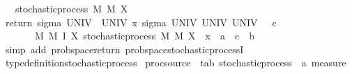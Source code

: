 \begin{isabellebody}
{\ \ \ stochastic{\isacharunderscore}{\kern0pt}process\ M\ M{\isacharprime}{\kern0pt}\ X{\isacharbraceright}{\kern0pt}{\isachardoublequoteclose}%
}%
%
\isadelimproof
%
\endisadelimproof
%
\isatagproof
{}\isamarkupfalse%
\isanewline
\ \ \isamarkupfalse%
\ {\isachardoublequoteopen}{\isacharparenleft}{\kern0pt}return\ {\isacharparenleft}{\kern0pt}sigma\ UNIV\ {\isacharbraceleft}{\kern0pt}{\isacharbraceleft}{\kern0pt}{\isacharbraceright}{\kern0pt}{\isacharcomma}{\kern0pt}\ UNIV{\isacharbraceright}{\kern0pt}{\isacharparenright}{\kern0pt}\ x{\isacharcomma}{\kern0pt}\ sigma\ UNIV\ UNIV{\isacharcomma}{\kern0pt}\ UNIV{\isacharcomma}{\kern0pt}\ {\isasymlambda}{\isacharunderscore}{\kern0pt}\ {\isacharunderscore}{\kern0pt}{\isachardot}{\kern0pt}\ c{\isacharparenright}{\kern0pt}\ {\isasymin}\isanewline
\ \ \ \ \ \ \ {\isacharbraceleft}{\kern0pt}{\isacharparenleft}{\kern0pt}M{\isacharcomma}{\kern0pt}\ M{\isacharprime}{\kern0pt}{\isacharcomma}{\kern0pt}\ I{\isacharcomma}{\kern0pt}\ X{\isacharparenright}{\kern0pt}{\isachardot}{\kern0pt}\ stochastic{\isacharunderscore}{\kern0pt}process\ M\ M{\isacharprime}{\kern0pt}\ X{\isacharbraceright}{\kern0pt}{\isachardoublequoteclose}\ \ x\ {\isacharcolon}{\kern0pt}{\isacharcolon}{\kern0pt}\ {\isacharprime}{\kern0pt}a\ \ c\ {\isacharcolon}{\kern0pt}{\isacharcolon}{\kern0pt}\ {\isacharprime}{\kern0pt}b\isanewline
\ \ \ \ \isamarkupfalse%
\ {\isacharparenleft}{\kern0pt}simp\ add{\isacharcolon}{\kern0pt}\ prob{\isacharunderscore}{\kern0pt}space{\isacharunderscore}{\kern0pt}return\ prob{\isacharunderscore}{\kern0pt}space{\isachardot}{\kern0pt}stochastic{\isacharunderscore}{\kern0pt}processI{\isacharparenright}{\kern0pt}\isanewline
{}\isamarkupfalse%
%
\endisatagproof
{\isafoldproof}%
%
\isadelimproof
%
\endisadelimproof
\isanewline
\isanewline
{}\isamarkupfalse%
\ type{\isacharunderscore}{\kern0pt}definition{\isacharunderscore}{\kern0pt}stochastic{\isacharunderscore}{\kern0pt}process\isanewline
\isanewline
{}\isamarkupfalse%
\ proc{\isacharunderscore}{\kern0pt}source\ {\isacharcolon}{\kern0pt}{\isacharcolon}{\kern0pt}\ {\isachardoublequoteopen}{\isacharparenleft}{\kern0pt}{\isacharprime}{\kern0pt}t{\isacharcomma}{\kern0pt}{\isacharprime}{\kern0pt}a{\isacharcomma}{\kern0pt}{\isacharprime}{\kern0pt}b{\isacharparenright}{\kern0pt}\ stochastic{\isacharunderscore}{\kern0pt}process\ {\isasymRightarrow}\ {\isacharprime}{\kern0pt}a\ measure{\isachardoublequoteclose}\isanewline

\end{isabellebody}
